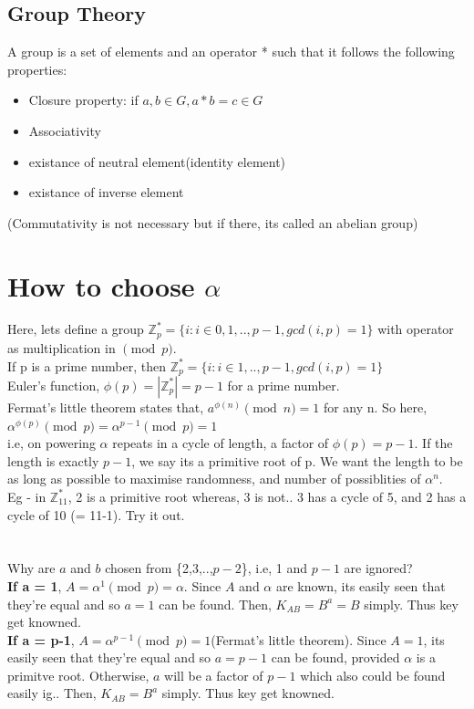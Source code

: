\documentclass[english, 11pt]{article}
\begin{document}
\subsection*{Group Theory}
A group is a set of elements and an operator * such that it follows the following properties:
\begin{itemize}
  \item Closure property: if $a,b \in G, a * b = c \in G$
  \item Associativity
  \item existance of neutral element(identity element)
  \item existance of inverse element
\end{itemize}
(Commutativity is not necessary but if there, its called an abelian group)

\section*{How to choose $\alpha$}
Here, lets define a group $\mathbb{Z}^{*}_{p} = \{i: i \in {0,1,..,p-1}, gcd(i,p) = 1\}$ with operator as multiplication in $\pmod{p}$.\\
If p is a prime number, then $\mathbb{Z}^{*}_{p} = \{i: i \in {1,..,p-1}, gcd(i,p) = 1\}$ \\
Euler's function, $\phi(p) = |\mathbb{Z}^{*}_{p}| = p-1$ for a prime number. \\
Fermat's little theorem states that, $a^{\phi(n)} \pmod{n} = 1$ for any n. So here,
$\alpha^{\phi(p)} \pmod{p} = \alpha^{p-1} \pmod{p} = 1$ \\
i.e, on powering $\alpha$ repeats in a cycle of length, a factor of $\phi(p) = p-1$.
If the length is exactly $p-1$, we say its a primitive root of p.
We want the length to be as long as possible to maximise randomness, and number of possiblities of $\alpha^n$.\\
Eg - in $\mathbb{Z}^{*}_{11}$, 2 is a primitive root whereas, 3 is not.. 3 has a cycle of 5, and 2 has a cycle of 10 (= 11-1). Try it out.
\\ \\ \\
Why are $a$ and $b$ chosen from \{2,3,..,$p-2$\}, i.e, 1 and $p-1$ are ignored?\\
\textbf{If a = 1}, $A = \alpha^1 \pmod{p} = \alpha$. Since $A$ and $\alpha$ are known, its easily seen that they're equal and so $a=1$ can be found. Then, $K_{AB} = B^a = B$ simply. Thus key get knowned.\\
\textbf{If a = p-1}, $A = \alpha^{p-1} \pmod{p} = 1$(Fermat's little theorem). Since $A=1$, its easily seen that they're equal and so $a=p-1$ can be found, provided $\alpha$ is a primitve root. Otherwise, $a$ will be a factor of $p-1$ which also could be found easily ig.. Then, $K_{AB} = B^a$ simply. Thus key get knowned.\\
\end{document}
